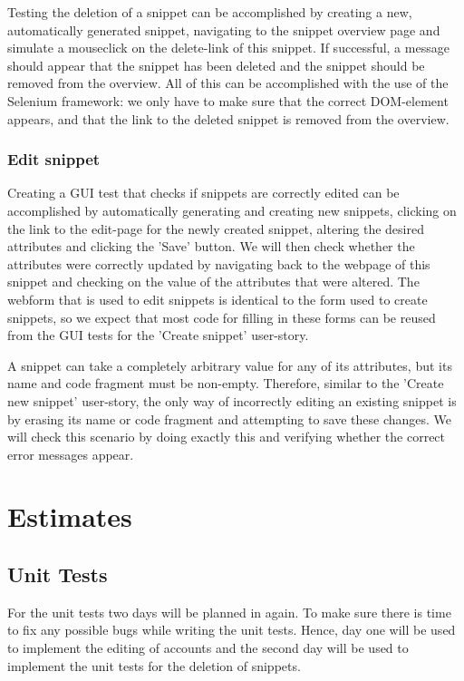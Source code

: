\documentclass[10pt,a4paper,BCOR12mm, headexclude, footexclude,
  twoside, openright]{scrartcl}
\numberwithin{equation}{section} %
\numberwithin{figure}{section} %
\numberwithin{table}{section} %
\begin{document}
Testing the deletion of a snippet can be accomplished by creating a new, automatically generated snippet, navigating to the snippet overview page and simulate a mouseclick on the delete-link of this snippet.
If successful, a message should appear that the snippet has been deleted and the snippet should be removed from the overview.
All of this can be accomplished with the use of the Selenium framework: we only have to make sure that the correct DOM-element appears, and that the link to the deleted snippet is removed from the overview.

\subsubsection*{Edit snippet}

Creating a GUI test that checks if snippets are correctly edited can be accomplished by automatically generating and creating new snippets, clicking on the link to the edit-page for the newly created snippet, altering the desired attributes and clicking the 'Save' button. We will then check whether the attributes were correctly updated by navigating back to the webpage of this snippet and checking on the value of the attributes that were altered.
The webform that is used to edit snippets is identical to the form used to create snippets, so we expect that most code for filling in these forms can be reused from the GUI tests for the 'Create snippet' user-story.

A snippet can take a completely arbitrary value for any of its attributes, but its name and code fragment must be non-empty.
Therefore, similar to the 'Create new snippet' user-story, the only way of incorrectly editing an existing snippet is by erasing its name or code fragment and attempting to save these changes.
We will check this scenario by doing exactly this and verifying whether the correct error messages appear.


\section{Estimates}
\subsection{Unit Tests}
For the unit tests two days will be planned in again. To make sure there is time
to fix any possible bugs while writing the unit tests. Hence, day one will be
used to implement the editing of accounts and the second day will be used to
implement the unit tests for the deletion of snippets.
\end{document}
